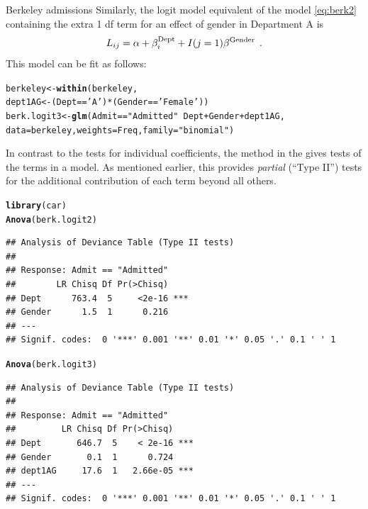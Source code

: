 \documentclass[11pt]{book}\usepackage[]{graphicx}\usepackage[]{color}
\makeatletter
\newcommand{\hlstr}[1]{\textcolor[rgb]{0.192,0.494,0.8}{#1}}%
\newcommand{\hlopt}[1]{\textcolor[rgb]{0,0,0}{#1}}%
\newcommand{\hlstd}[1]{\textcolor[rgb]{0.345,0.345,0.345}{#1}}%
\newcommand{\hlkwb}[1]{\textcolor[rgb]{0.69,0.353,0.396}{#1}}%
\newcommand{\hlkwc}[1]{\textcolor[rgb]{0.333,0.667,0.333}{#1}}%
\newcommand{\hlkwd}[1]{\textcolor[rgb]{0.737,0.353,0.396}{\textbf{#1}}}%
\newenvironment{kframe}{%
 \def\at@end@of@kframe{}%
 \ifinner\ifhmode%
  \def\at@end@of@kframe{\end{minipage}}%
  \begin{minipage}{\columnwidth}%
 \fi\fi%
 \def\FrameCommand##1{\hskip\@totalleftmargin \hskip-\fboxsep
 \colorbox{shadecolor}{##1}\hskip-\fboxsep
     \hskip-\linewidth \hskip-\@totalleftmargin \hskip\columnwidth}%
 \MakeFramed {\advance\hsize-\width
   \@totalleftmargin\z@ \linewidth\hsize
   \@setminipage}}%
 {\par\unskip\endMakeFramed%
 \at@end@of@kframe}
\newenvironment{knitrout}{}{} %
\renewenvironment{knitrout}{\small\renewcommand{\baselinestretch}{.85}}{} %
\makeatother
\begin{document}
\begin{Example}[berkeley7]{Berkeley admissions}
Similarly, the logit model equivalent of the \loglin model \eqref{eq:berk2}
containing the extra 1 df term for an effect of gender in Department A is
\begin{equation}\label{eq:berk4}
  L_{ij} =
  \alpha   +  \beta _i^{\mbox{\scriptsize Dept}}
  +  I(j=1) \beta^{\mbox{\scriptsize Gender}}
  \:\: .
\end{equation}
This model can be fit as follows:
\begin{knitrout}
\color{fgcolor}\begin{kframe}
\begin{alltt}
\hlstd{berkeley} \hlkwb{<-} \hlkwd{within}\hlstd{(berkeley,}
                   \hlstd{dept1AG} \hlkwb{<-} \hlstd{(Dept}\hlopt{==}\hlstr{'A'}\hlstd{)}\hlopt{*}\hlstd{(Gender}\hlopt{==}\hlstr{'Female'}\hlstd{))}
\hlstd{berk.logit3} \hlkwb{<-} \hlkwd{glm}\hlstd{(Admit}\hlopt{==}\hlstr{"Admitted"} \hlopt{~} \hlstd{Dept} \hlopt{+} \hlstd{Gender} \hlopt{+} \hlstd{dept1AG,}
                   \hlkwc{data}\hlstd{=berkeley,} \hlkwc{weights}\hlstd{=Freq,} \hlkwc{family}\hlstd{=}\hlstr{"binomial"}\hlstd{)}
\end{alltt}
\end{kframe}
\end{knitrout}
In contrast to the tests for individual coefficients, the 
method in the  gives \LR tests of the terms in a model.
As mentioned earlier, this provides \emph{partial}
(``Type II'') tests for the additional contribution of each term beyond
all others.
\begin{knitrout}
\color{fgcolor}\begin{kframe}
\begin{alltt}
\hlkwd{library}\hlstd{(car)}
\hlkwd{Anova}\hlstd{(berk.logit2)}
\end{alltt}
\begin{verbatim}
## Analysis of Deviance Table (Type II tests)
## 
## Response: Admit == "Admitted"
##        LR Chisq Df Pr(>Chisq)    
## Dept      763.4  5     <2e-16 ***
## Gender      1.5  1      0.216    
## ---
## Signif. codes:  0 '***' 0.001 '**' 0.01 '*' 0.05 '.' 0.1 ' ' 1
\end{verbatim}
\begin{alltt}
\hlkwd{Anova}\hlstd{(berk.logit3)}
\end{alltt}
\begin{verbatim}
## Analysis of Deviance Table (Type II tests)
## 
## Response: Admit == "Admitted"
##         LR Chisq Df Pr(>Chisq)    
## Dept       646.7  5    < 2e-16 ***
## Gender       0.1  1      0.724    
## dept1AG     17.6  1   2.66e-05 ***
## ---
## Signif. codes:  0 '***' 0.001 '**' 0.01 '*' 0.05 '.' 0.1 ' ' 1
\end{verbatim}
\end{kframe}
\end{knitrout}



\end{Example}
\end{document}
